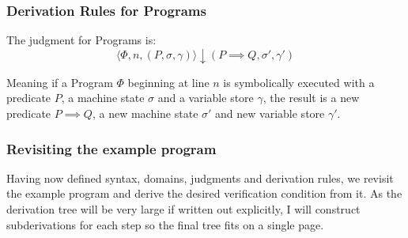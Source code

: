 \subsubsection*{Derivation Rules for Programs}

The judgment for Programs is:
\[
\langle \Phi, n, (P, \sigma, \gamma) \rangle \downarrow (P \implies Q, \sigma', \gamma')
\]

Meaning if a Program $\Phi$ beginning at line $n$ is symbolically executed with a predicate $P$, a machine state $\sigma$ and a variable store $\gamma$, the result is a new predicate $P \implies Q$, a new machine state $\sigma'$ and new variable store $\gamma'$.



\begin{prooftree}
\end{prooftree}

\begin{prooftree}
\end{prooftree}

\begin{prooftree}
\end{prooftree}





\subsubsection*{Revisiting the example program}
Having now defined syntax, domains, judgments and derivation rules, we revisit the example program and derive the desired verification condition from it.
As the derivation tree will be very large if written out explicitly, I will construct subderivations for each step so the final tree fits on a single page. 


